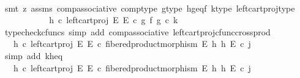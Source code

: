 \begin{isabellebody}
\ \ \ \ \ \ \ \ \isamarkupfalse%
\ {\isacharparenleft}{\kern0pt}smt\ {\isacharparenleft}{\kern0pt}z{}{\isacharparenright}{\kern0pt}\ assms{\isacharparenleft}{\kern0pt}{}{\isacharparenright}{\kern0pt}\ comp{\isacharunderscore}{\kern0pt}associative{}\ comp{\isacharunderscore}{\kern0pt}type\ g{\isacharunderscore}{\kern0pt}type\ h{\isacharunderscore}{\kern0pt}g{\isacharunderscore}{\kern0pt}eq{\isacharunderscore}{\kern0pt}f\ k{\isacharunderscore}{\kern0pt}type\ left{\isacharunderscore}{\kern0pt}cart{\isacharunderscore}{\kern0pt}proj{\isacharunderscore}{\kern0pt}type{\isacharparenright}{\kern0pt}\isanewline
\ \ \ \ \ \ \isamarkupfalse%
\ \isamarkupfalse%
\ {\isachardoublequoteopen}{\isachardot}{\kern0pt}{\isachardot}{\kern0pt}{\isachardot}{\kern0pt}\ {\isacharequal}{\kern0pt}\ h\ {\isasymcirc}\isactrlsub c\ left{\isacharunderscore}{\kern0pt}cart{\isacharunderscore}{\kern0pt}proj\ E\ E\ {\isasymcirc}\isactrlsub c\ {\isacharparenleft}{\kern0pt}g\ {\isasymtimes}\isactrlsub f\ g{\isacharparenright}{\kern0pt}\ {\isasymcirc}\isactrlsub c\ k{\isachardoublequoteclose}\isanewline
\ \ \ \ \ \ \ \ \isamarkupfalse%
\ {\isacharparenleft}{\kern0pt}typecheck{\isacharunderscore}{\kern0pt}cfuncs{\isacharcomma}{\kern0pt}\ simp\ add{\isacharcolon}{\kern0pt}\ comp{\isacharunderscore}{\kern0pt}associative{}\ left{\isacharunderscore}{\kern0pt}cart{\isacharunderscore}{\kern0pt}proj{\isacharunderscore}{\kern0pt}cfunc{\isacharunderscore}{\kern0pt}cross{\isacharunderscore}{\kern0pt}prod{\isacharparenright}{\kern0pt}\isanewline
\ \ \ \ \ \ \isamarkupfalse%
\ \isamarkupfalse%
\ {\isachardoublequoteopen}{\isachardot}{\kern0pt}{\isachardot}{\kern0pt}{\isachardot}{\kern0pt}\ {\isacharequal}{\kern0pt}\ h\ {\isasymcirc}\isactrlsub c\ left{\isacharunderscore}{\kern0pt}cart{\isacharunderscore}{\kern0pt}proj\ E\ E\ {\isasymcirc}\isactrlsub c\ fibered{\isacharunderscore}{\kern0pt}product{\isacharunderscore}{\kern0pt}morphism\ E\ h\ h\ E\ {\isasymcirc}\isactrlsub c\ j{\isachardoublequoteclose}\isanewline
\ \ \ \ \ \ \ \ \isamarkupfalse%
\ {\isacharparenleft}{\kern0pt}simp\ add{\isacharcolon}{\kern0pt}\ k{\isacharunderscore}{\kern0pt}h{\isacharunderscore}{\kern0pt}eq{\isacharparenright}{\kern0pt}\isanewline
\ \ \ \ \ \ \isamarkupfalse%
\ \isamarkupfalse%
\ {\isachardoublequoteopen}{\isachardot}{\kern0pt}{\isachardot}{\kern0pt}{\isachardot}{\kern0pt}\ {\isacharequal}{\kern0pt}\ {\isacharparenleft}{\kern0pt}{\isacharparenleft}{\kern0pt}h\ {\isasymcirc}\isactrlsub c\ left{\isacharunderscore}{\kern0pt}cart{\isacharunderscore}{\kern0pt}proj\ E\ E{\isacharparenright}{\kern0pt}\ {\isasymcirc}\isactrlsub c\ fibered{\isacharunderscore}{\kern0pt}product{\isacharunderscore}{\kern0pt}morphism\ E\ h\ h\ E{\isacharparenright}{\kern0pt}\ {\isasymcirc}\isactrlsub c\ j{\isachardoublequoteclose}\isanewline

\end{isabellebody}
